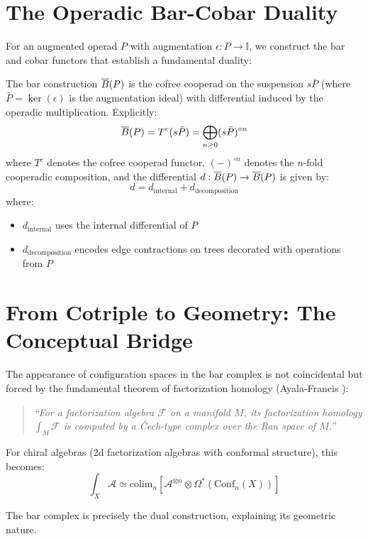 \section{The Operadic Bar-Cobar Duality}
 
For an augmented operad $P$ with augmentation $\epsilon : P \to \mathbb{I}$, we construct the bar and cobar functors that establish a fundamental duality:
 
\begin{definition}
The bar construction $\overline{B}(P)$ is the cofree cooperad on the suspension $s\bar{P}$ (where $\bar{P} = \ker(\epsilon)$ is the augmentation ideal) with differential induced by the operadic multiplication. Explicitly:
\[
\overline{B}(P) = T^c(s\bar{P}) = \bigoplus_{n \geq 0} (s\bar{P})^{\circ n}
\]
where $T^c$ denotes the cofree cooperad functor, $(-)^{\circ n}$ denotes the $n$-fold cooperadic composition,
and the differential $d: \overline{B}(P) \to \overline{B}(P)$ is given by:
\[
d = d_{\text{internal}} + d_{\text{decomposition}}
\]
where:
\begin{itemize}
\item $d_{\text{internal}}$ uses the internal differential of $P$
\item $d_{\text{decomposition}}$ encodes edge contractions on trees decorated with operations from $P$
\end{itemize}
\end{definition}

\section{From Cotriple to Geometry: The Conceptual Bridge}

\begin{remark}
The appearance of configuration spaces in the bar complex is not coincidental but forced by the 
fundamental theorem of factorization homology (Ayala-Francis \cite{AF}):

\begin{quote}
\emph{``For a factorization algebra $\mathcal{F}$ on a manifold $M$, its factorization homology 
$\int_M \mathcal{F}$ is computed by a Čech-type complex over the Ran space of $M$.''}
\end{quote}

For chiral algebras (2d factorization algebras with conformal structure), this becomes:
$$\int_X \mathcal{A} \simeq \text{colim}_{n} \left[ \mathcal{A}^{\otimes n} \otimes \Omega^*(\text{Conf}_n(X)) \right]$$

The bar complex is precisely the dual construction, explaining its geometric nature.
\end{remark}

